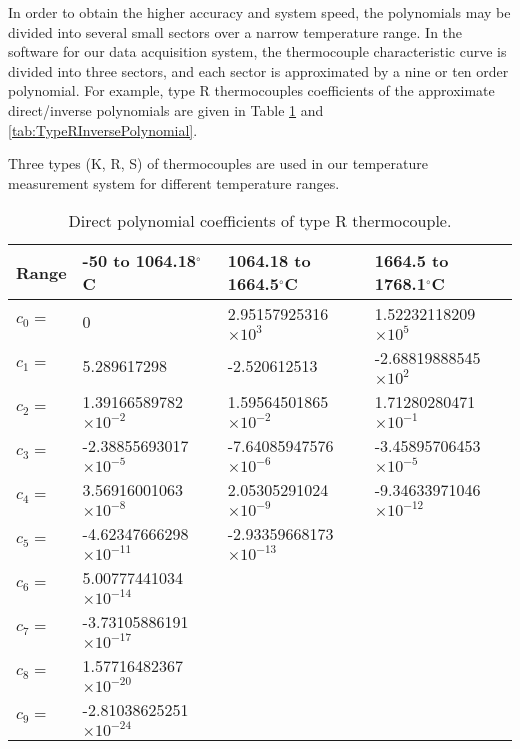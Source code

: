 In order to obtain the higher accuracy and system speed, the polynomials may be divided into several small sectors over a narrow temperature range.
In the software for our data acquisition system, the thermocouple characteristic curve is divided into three sectors, and each sector is approximated by a nine or ten order
polynomial.
For example, type R thermocouples coefficients of the approximate direct/inverse polynomials are given in Table \ref{tab:TypeRDirectPolynomial} and \ref{tab:TypeRInversePolynomial}.

Three types (K, R, S) of thermocouples are used in our temperature measurement system for different temperature ranges.

\begin{table}[htbp]
  \centering
  \small
  \caption{Direct polynomial coefficients of type R thermocouple.}
    \begin{tabular}{llll}
    \toprule
    Range & -50 to 1064.18$^{\circ}$C & 1064.18 to 1664.5$^{\circ}$C & 1664.5 to 1768.1$^{\circ}$C \\
    \midrule
    $c_0=$ & 0     & 2.95157925316$\times10^{3}$ & 1.52232118209$\times10^{5}$ \\
    $c_1=$ & 5.289617298 & -2.520612513 & -2.68819888545$\times10^{2}$ \\
    $c_2=$ & 1.39166589782$\times10^{-2}$ & 1.59564501865$\times10^{-2}$ & 1.71280280471$\times10^{-1}$ \\
    $c_3=$ & -2.38855693017$\times10^{-5}$ & -7.64085947576$\times10^{-6}$ & -3.45895706453$\times10^{-5}$ \\
    $c_4=$ & 3.56916001063$\times10^{-8}$ & 2.05305291024$\times10^{-9}$ & -9.34633971046$\times10^{-12}$ \\
    $c_5=$ & -4.62347666298$\times10^{-11}$ & -2.93359668173$\times10^{-13}$ &  \\
    $c_6=$ & 5.00777441034$\times10^{-14}$ &       &  \\
    $c_7=$ & -3.73105886191$\times10^{-17}$ &       &  \\
    $c_8=$ & 1.57716482367$\times10^{-20}$ &       &  \\
    $c_9=$ & -2.81038625251$\times10^{-24}$ &       &  \\
    \bottomrule
    \end{tabular}%
  \label{tab:TypeRDirectPolynomial}%
\end{table}%

